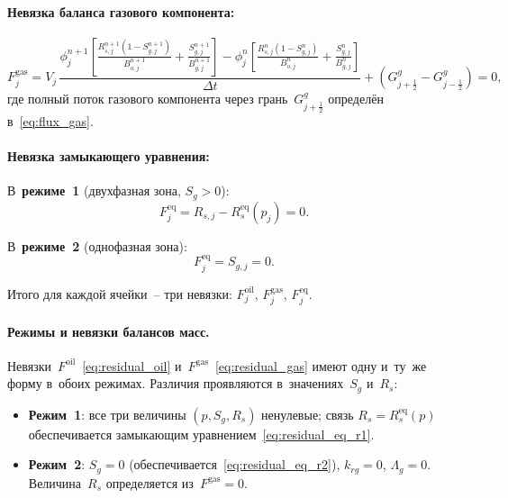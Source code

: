 \documentclass[12pt,a4paper]{article}
\newcommand{\half}{\tfrac{1}{2}}
\begin{document}
\paragraph{Невязка баланса газового компонента:}
\begin{equation}\label{eq:residual_gas}
  \boxed{
    F_j^{\text{gas}} = V_j\,
      \frac{\phi_j^{n+1}\left[\frac{R_{s,j}^{n+1}(1-S_{g,j}^{n+1})}{B_{o,j}^{n+1}}
            + \frac{S_{g,j}^{n+1}}{B_{g,j}^{n+1}}\right]
            - \phi_j^n\left[\frac{R_{s,j}^n(1-S_{g,j}^n)}{B_{o,j}^n}
            + \frac{S_{g,j}^n}{B_{g,j}^n}\right]}{\Delta t}
      + \left(G_{j+\half}^{g} - G_{j-\half}^{g}\right) = 0,
  }
\end{equation}
где полный поток газового компонента через грань~$G_{j+\half}^{g}$
определён в~\eqref{eq:flux_gas}.

\paragraph{Невязка замыкающего уравнения:}

В~\textbf{режиме~1} (двухфазная зона, $S_g > 0$):
\begin{equation}\label{eq:residual_eq_r1}
  F_j^{\text{eq}} = R_{s,j} - R_s^{\text{eq}}(p_j) = 0.
\end{equation}

В~\textbf{режиме~2} (однофазная зона):
\begin{equation}\label{eq:residual_eq_r2}
  F_j^{\text{eq}} = S_{g,j} = 0.
\end{equation}

Итого для каждой ячейки~-- три невязки: $F_j^{\text{oil}}$,
$F_j^{\text{gas}}$, $F_j^{\text{eq}}$.

\paragraph{Режимы и невязки балансов масс.}
Невязки~$F^{\text{oil}}$~\eqref{eq:residual_oil}
и~$F^{\text{gas}}$~\eqref{eq:residual_gas} имеют одну и~ту~же форму
в~обоих режимах. Различия проявляются в~значениях~$S_g$ и~$R_s$:
\begin{itemize}[nosep]
  \item \textbf{Режим~1}: все три величины $(p, S_g, R_s)$ ненулевые;
        связь $R_s = R_s^{\text{eq}}(p)$ обеспечивается замыкающим
        уравнением~\eqref{eq:residual_eq_r1}.
  \item \textbf{Режим~2}: $S_g = 0$ (обеспечивается~\eqref{eq:residual_eq_r2}),
        $k_{rg} = 0$, $\Lambda_g = 0$. Величина~$R_s$ определяется
        из~$F^{\text{gas}} = 0$.
\end{itemize}
\end{document}
